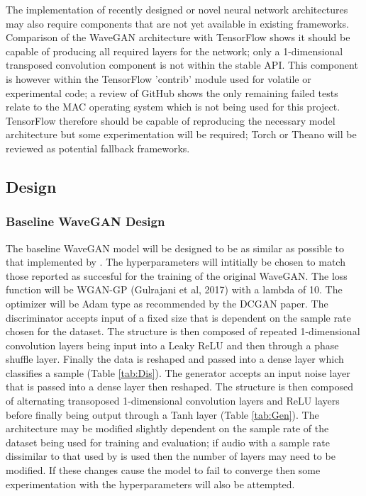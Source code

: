 \documentclass[a4paper, dvipsnames, titlepage]{article}
\begin{document}
The implementation of recently designed or novel neural network architectures may also require components that are not yet available in existing frameworks.
Comparison of the WaveGAN architecture with TensorFlow shows it should be capable of producing all required layers for the network; only a 1-dimensional transposed convolution component is not within the stable API.
\newline
\newline
This component is however within the TensorFlow 'contrib' module used for volatile or experimental code; a review of GitHub shows the only remaining failed tests relate to the MAC operating system which is not being used for this project.
TensorFlow therefore should be capable of reproducing the necessary model architecture but some experimentation will be required; Torch or Theano will be reviewed as potential fallback frameworks.

\subsection{Design}

\subsubsection{Baseline WaveGAN Design}

The baseline WaveGAN model will be designed to be as similar as possible to that implemented by \citeauthor{2018arXiv180204208D}.
The hyperparameters will intitially be chosen to match those reported as succesful for the training of the original WaveGAN.
The loss function will be WGAN-GP (Gulrajani et al, 2017) with a lambda of 10.
The optimizer will be Adam type as recommended by the DCGAN paper.
\newline
\newline
The discriminator accepts input of a fixed size that is dependent on the sample rate chosen for the dataset.
The structure is then composed of repeated 1-dimensional convolution layers being input into a Leaky ReLU and then through a phase shuffle layer.
Finally the data is reshaped and passed into a dense layer which classifies a sample (Table \ref{tab:Dis}).
\newline
\newline
The generator accepts an input noise layer that is passed into a dense layer then reshaped.
The structure is then composed of alternating transoposed 1-dimensional convolution layers and ReLU layers before finally being output through a Tanh layer (Table \ref{tab:Gen}).
\newline
\newline
The architecture may be modified slightly dependent on the sample rate of the dataset being used for training and evaluation; if audio with a sample rate dissimilar to that used by \citeauthor{2018arXiv180204208D} is used then the number of layers may need to be modified.
If these changes cause the model to fail to converge then some experimentation with the hyperparameters will also be attempted.
\end{document}
